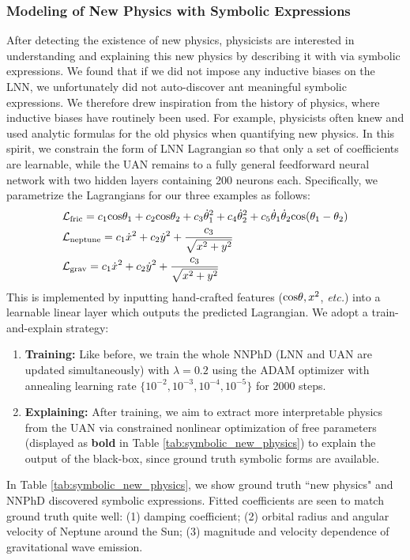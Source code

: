 \documentclass[aps,pre,reprint,superscriptaddress,nofootinbib,amsmath,amssymb]{revtex4-2}
\def\etc{{\frenchspacing\it etc.}}
\newcommand{\lag}{\mathcal{L}}
\begin{document}
\subsubsection{Modeling of New Physics with Symbolic Expressions}\label{sec:symbolic_subsec}

After detecting the existence of new physics, physicists 
are interested in understanding and explaining this new physics by describing it
with via symbolic expressions. 
We found that if we did not impose any inductive biases on the LNN, we
unfortunately did not auto-discover ant meaningful symbolic expressions.
We therefore drew inspiration from the history of physics, where inductive biases have routinely been used. For example, physicists often knew and used analytic formulas for the old physics when quantifying new physics.
In this spirit, we constrain the form of LNN Lagrangian so that only a set of coefficients are learnable, while the UAN remains to a fully general
feedforward neural network with two hidden layers containing 200 neurons each. Specifically, we  parametrize the Lagrangians for our three examples as follows:
{\footnotesize \begin{eqnarray}
\begin{aligned}
    &\lag_{\rm fric}=c_1{\cos}\theta_1+c_2{\rm cos}\theta_2+c_3\dot{\theta}_1^2+c_4\dot{\theta}_2^2+c_5\dot{\theta}_1\dot{\theta}_2{\rm cos}(\theta_1-\theta_2)\\
    &\lag_{\rm neptune}=c_1\dot{x}^2+c_2\dot{y}^2+\frac{c_3}{\sqrt{x^2+y^2}}\\
    &\lag_{\rm grav}=c_1\dot{x}^2+c_2\dot{y}^2+\frac{c_3}{\sqrt{x^2+y^2}}
\end{aligned}
\end{eqnarray}}
This is implemented by inputting hand-crafted features (${\rm cos}\theta, x^2$, \etc) into a learnable linear layer which outputs the predicted Lagrangian. We adopt a train-and-explain strategy: 
\begin{enumerate}
\item {\bf Training:} Like before, we train the whole NNPhD (LNN and UAN are updated simultaneously) with $\lambda=0.2$ using the ADAM optimizer with annealing learning rate $\{10^{-2}, 10^{-3}, 10^{-4}, 10^{-5}\}$ for 2000 steps. 
\item {\bf Explaining:} After training, we aim to extract more interpretable physics from the UAN via constrained nonlinear optimization of free parameters (displayed as {\bf bold} in Table \ref{tab:symbolic_new_physics}) to explain the output of the black-box, since ground truth symbolic forms are available. %
\end{enumerate}
In Table \ref{tab:symbolic_new_physics}, we show ground truth ``new physics" and NNPhD discovered symbolic expressions. Fitted coefficients are seen to match ground truth quite well: (1) damping coefficient; (2) orbital radius and angular velocity of Neptune around the Sun; (3) magnitude and velocity dependence of gravitational wave emission.
\end{document}
